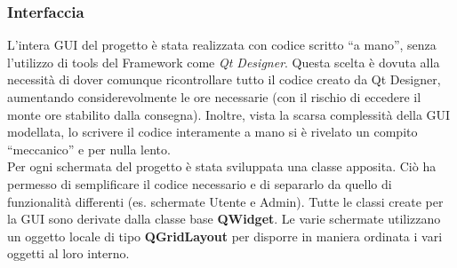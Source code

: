 \documentclass[a4paper,10pt] {article}
\begin{document}
\subsubsection{Interfaccia}
L'intera GUI del progetto è stata realizzata con codice scritto ``a mano'', senza l'utilizzo di tools del Framework come \textsl{Qt Designer}.
Questa scelta è dovuta alla necessità di dover comunque ricontrollare tutto il codice creato da Qt Designer, aumentando considerevolmente
le ore necessarie (con il rischio di eccedere il monte ore stabilito dalla consegna). Inoltre, vista la scarsa complessità della GUI modellata, lo scrivere
il codice interamente a mano si è rivelato un compito ``meccanico'' e per nulla lento. \\
Per ogni schermata del progetto è stata sviluppata una classe apposita. Ciò ha permesso di semplificare il codice necessario e di separarlo da quello di funzionalità
differenti (es. schermate Utente e Admin). Tutte le classi create per la GUI sono derivate dalla classe base \textbf{QWidget}. Le varie schermate utilizzano
un oggetto locale di tipo \textbf{QGridLayout} per disporre in maniera ordinata i vari oggetti al loro interno.
\end{document}
